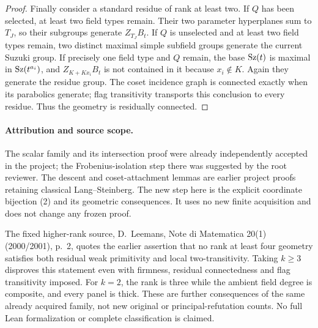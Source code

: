 \documentclass[11pt,a4paper]{article}
\begin{document}
\begin{proof}
Finally consider a standard residue of rank at least two. If $Q$ has
been selected, at least two field types remain. Their two parameter
hyperplanes sum to $T_J$, so their subgroups generate $Z_{T_J}B_t$.
If $Q$ is unselected and at least two field types remain, two distinct
maximal simple subfield groups generate the current Suzuki group.
If precisely one field type and $Q$ remain, the base $\operatorname{Sz}(t)$ is
maximal in $\operatorname{Sz}(t^{a_i})$, and $Z_{K+Kx_i}B_t$ is not contained in
it because $x_i\notin K$. Again they generate the residue group.
The coset incidence graph is connected exactly when its parabolics
generate; flag transitivity transports this conclusion to every residue.
Thus the geometry is residually connected.
\end{proof}

\paragraph{Attribution and source scope.}
The scalar family and its intersection proof were already independently
accepted in the project; the Frobenius-isolation step there was suggested
by the root reviewer. The descent and coset-attachment lemmas are earlier
project proofs retaining classical Lang--Steinberg. The new step here is
the explicit coordinate bijection (2) and its geometric consequences.
It uses no new finite acquisition and does not change any frozen proof.

The fixed higher-rank source, D.~Leemans, Note di Matematica 20(1)
(2000/2001), p.~2, quotes the earlier assertion that no rank at least four
geometry satisfies both residual weak primitivity and local
two-transitivity. Taking $k\ge3$ disproves this statement even with
firmness, residual connectedness and flag transitivity imposed. For
$k=2$, the rank is three while the ambient field degree is composite,
and every panel is thick. These are further consequences of the same
already acquired family, not new original or principal-refutation counts.
No full Lean formalization or complete classification is claimed.
\end{document}
